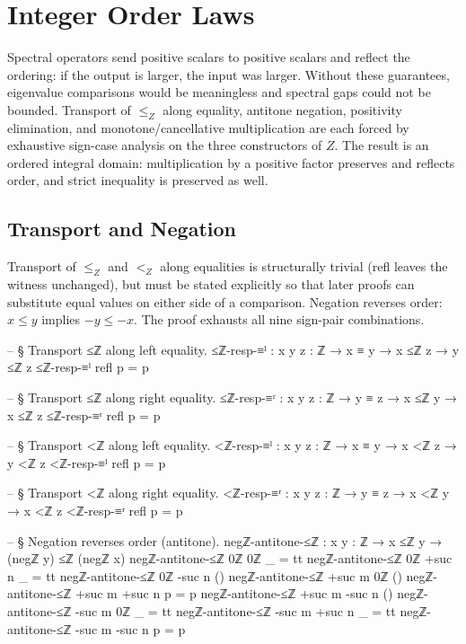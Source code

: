 \documentclass[11pt,a4paper]{book}
\def\mathbb#1{#1}%
\def\texttt#1{#1}%
\begin{document}
\chapter{Integer Order Laws}

Spectral operators send positive scalars to positive scalars and reflect the ordering: if the output is larger, the input was larger. Without these guarantees, eigenvalue comparisons would be meaningless and spectral gaps could not be bounded. Transport of $\le_{\mathbb{Z}}$ along equality, antitone negation, positivity elimination, and monotone/cancellative multiplication are each forced by exhaustive sign-case analysis on the three constructors of $\mathbb{Z}$. The result is an ordered integral domain: multiplication by a positive factor preserves and reflects order, and strict inequality is preserved as well.

\section{Transport and Negation}

Transport of $\le_{\mathbb{Z}}$ and $<_{\mathbb{Z}}$ along equalities is structurally trivial (\texttt{refl} leaves the witness unchanged), but must be stated explicitly so that later proofs can substitute equal values on either side of a comparison.
Negation reverses order: $x \le y$ implies $-y \le -x$.
The proof exhausts all nine sign-pair combinations.

\begin{code}
-- § Transport ≤ℤ along left equality.
≤ℤ-resp-≡ˡ : {x y z : ℤ} → x ≡ y → x ≤ℤ z → y ≤ℤ z
≤ℤ-resp-≡ˡ refl p = p

-- § Transport ≤ℤ along right equality.
≤ℤ-resp-≡ʳ : {x y z : ℤ} → y ≡ z → x ≤ℤ y → x ≤ℤ z
≤ℤ-resp-≡ʳ refl p = p

-- § Transport <ℤ along left equality.
<ℤ-resp-≡ˡ : {x y z : ℤ} → x ≡ y → x <ℤ z → y <ℤ z
<ℤ-resp-≡ˡ refl p = p

-- § Transport <ℤ along right equality.
<ℤ-resp-≡ʳ : {x y z : ℤ} → y ≡ z → x <ℤ y → x <ℤ z
<ℤ-resp-≡ʳ refl p = p

-- § Negation reverses order (antitone).
negℤ-antitone-≤ℤ : {x y : ℤ} → x ≤ℤ y → (negℤ y) ≤ℤ (negℤ x)
negℤ-antitone-≤ℤ {0ℤ} {0ℤ} _ = tt
negℤ-antitone-≤ℤ {0ℤ} {+suc n} _ = tt
negℤ-antitone-≤ℤ {0ℤ} { -suc n } ()
negℤ-antitone-≤ℤ {+suc m} {0ℤ} ()
negℤ-antitone-≤ℤ {+suc m} {+suc n} p = p
negℤ-antitone-≤ℤ {+suc m} { -suc n } ()
negℤ-antitone-≤ℤ { -suc m } {0ℤ} _ = tt
negℤ-antitone-≤ℤ { -suc m } {+suc n} _ = tt
negℤ-antitone-≤ℤ { -suc m } { -suc n } p = p
\end{code}
\end{document}
